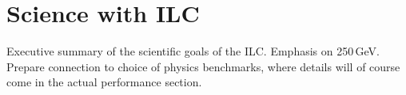 \chapter{Science with ILC}
Executive summary of the scientific goals of the ILC.
Emphasis on 250\,GeV. Prepare connection to choice of physics benchmarks, where details will of course come in the actual performance section.

